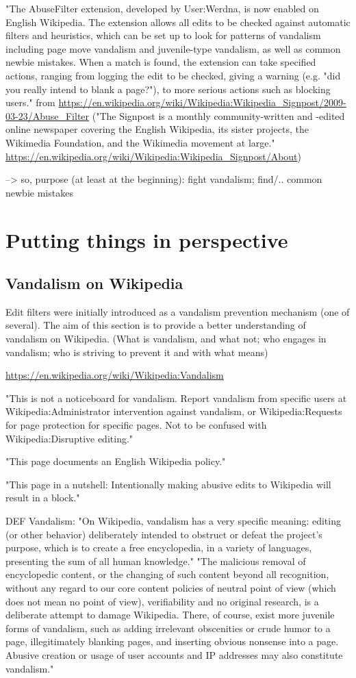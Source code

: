 \documentclass{sigchi}
\begin{document}
"The AbuseFilter extension, developed by User:Werdna, is now enabled on English Wikipedia. The extension allows all edits to be checked against automatic filters and heuristics, which can be set up to look for patterns of vandalism including page move vandalism and juvenile-type vandalism, as well as common newbie mistakes. When a match is found, the extension can take specified actions, ranging from logging the edit to be checked, giving a warning (e.g. "did you really intend to blank a page?"), to more serious actions such as blocking users."
from \url{https://en.wikipedia.org/wiki/Wikipedia:Wikipedia_Signpost/2009-03-23/Abuse_Filter}
("The Signpost is a monthly community-written and -edited online newspaper covering the English Wikipedia, its sister projects, the Wikimedia Foundation, and the Wikimedia movement at large." \url{https://en.wikipedia.org/wiki/Wikipedia:Wikipedia_Signpost/About})

--> so, purpose (at least at the beginning): fight vandalism; find/.. common newbie mistakes

\section{Putting things in perspective}
\subsection{Vandalism on Wikipedia}

Edit filters were initially introduced as a vandalism prevention mechanism (one of several).
The aim of this section is to provide a better understanding of vandalism on Wikipedia. (What is vandalism, and what not; who engages in vandalism; who is striving to prevent it and with what means)

\url{https://en.wikipedia.org/wiki/Wikipedia:Vandalism}

"This is not a noticeboard for vandalism. Report vandalism from specific users at Wikipedia:Administrator intervention against vandalism, or Wikipedia:Requests for page protection for specific pages.
Not to be confused with Wikipedia:Disruptive editing."

"This page documents an English Wikipedia policy."

"This page in a nutshell: Intentionally making abusive edits to Wikipedia will result in a block."

DEF Vandalism:
"On Wikipedia, vandalism has a very specific meaning: editing (or other behavior) deliberately intended to obstruct or defeat the project's purpose, which is to create a free encyclopedia, in a variety of languages, presenting the sum of all human knowledge."
"The malicious removal of encyclopedic content, or the changing of such content beyond all recognition, without any regard to our core content policies of neutral point of view (which does not mean no point of view), verifiability and no original research, is a deliberate attempt to damage Wikipedia. There, of course, exist more juvenile forms of vandalism, such as adding irrelevant obscenities or crude humor to a page, illegitimately blanking pages, and inserting obvious nonsense into a page. Abusive creation or usage of user accounts and IP addresses may also constitute vandalism."
\end{document}
